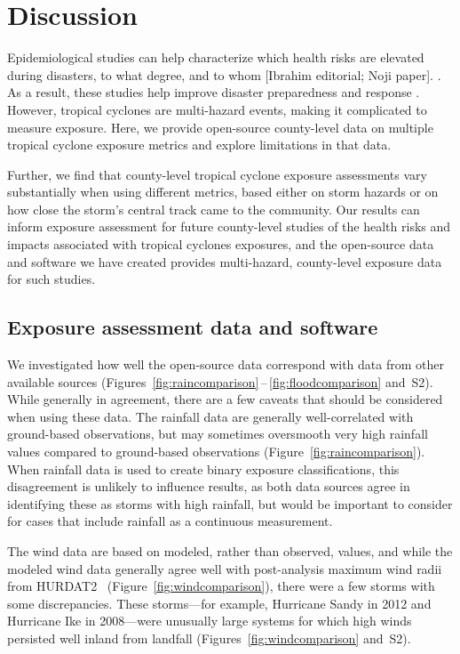 \section*{Discussion}

Epidemiological studies can help characterize which health risks are elevated
during disasters, to what degree, and to whom [Ibrahim editorial; Noji paper].
\parencite{ibrahim2005unfortunate, noji2005disasters}.  As a result, these studies help improve
disaster preparedness and response \parencite{noji2005disasters}.  However,
tropical cyclones are multi-hazard events, making it complicated to measure
exposure.  Here, we provide open-source county-level data on multiple tropical
cyclone exposure metrics and explore limitations in that data.  

Further, we find that county-level tropical cyclone exposure assessments vary
substantially when using different metrics, based either on storm hazards or on
how close the storm's central track came to the community. Our results can
inform exposure assessment for future county-level studies of the health risks
and impacts associated with tropical cyclones exposures, and the open-source
data and software we have created provides multi-hazard, county-level exposure
data for such studies.

\subsection*{Exposure assessment data and software}

We investigated how well the open-source data correspond with
data from other available sources
(Figures~\ref{fig:raincomparison}\,--\,\ref{fig:floodcomparison} and~S2). While
generally in agreement, there are a few caveats that should be considered when
using these data. The rainfall data are generally
well-correlated with ground-based observations, but may sometimes
oversmooth very high rainfall values compared to ground-based observations
(Figure~\ref{fig:raincomparison}). When rainfall data is used to create binary
exposure classifications, this disagreement is unlikely to influence results,
as both data sources agree in identifying these as storms with high rainfall,
but would be important to consider for cases that include rainfall as a
continuous measurement. 

The wind data are based on modeled, rather than observed, values, and while the
modeled wind data generally agree well with post-analysis maximum wind radii
from \ac{HURDAT2}~\parencite{landsea2013} (Figure~\ref{fig:windcomparison}),
there were a few storms with some discrepancies. These storms---for example, Hurricane Sandy
in 2012 and Hurricane Ike in 2008---were
unusually large systems for which high winds persisted well inland from
landfall (Figures~\ref{fig:windcomparison}
and~S2). 

